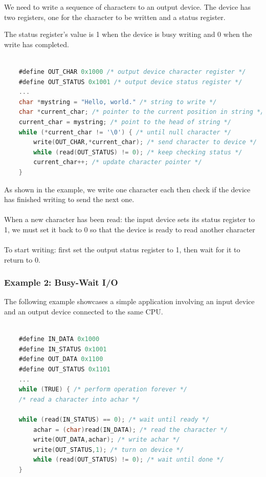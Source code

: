 We need to write a sequence of characters to an output device. The device has two registers, one for the
character to be written and a status register.

The status register's value is 1 when the device is busy writing and 0 when the write has completed.


\begin{lstlisting}[language=C]

    #define OUT_CHAR 0x1000 /* output device character register */
    #define OUT_STATUS 0x1001 /* output device status register */
    ...
    char *mystring = "Hello, world." /* string to write */
    char *current_char; /* pointer to the current position in string */
    current_char = mystring; /* point to the head of string */
    while (*current_char != '\0') { /* until null character */
        write(OUT_CHAR,*current_char); /* send character to device */
        while (read(OUT_STATUS) != 0); /* keep checking status */
        current_char++; /* update character pointer */
    }   
\end{lstlisting}

As shown in the example, we write one character each then check if the device has finished writing to
send the next one.

\paragraph{}
When a new character has been read: the input device sets its status register to 1, we must set it back to 0 so that the device is ready to read another character 

\paragraph{}To start writing: first set the output status register to 1, then wait for it to return to 0.

\subsubsection{Example 2: Busy-Wait I/O}
The following example showcases a simple application involving an input device and an output device
connected to the same CPU.

\begin{lstlisting}[language=C]

    #define IN_DATA 0x1000
    #define IN_STATUS 0x1001
    #define OUT_DATA 0x1100
    #define OUT_STATUS 0x1101
    ...
    while (TRUE) { /* perform operation forever */
    /* read a character into achar */
    
    while (read(IN_STATUS) == 0); /* wait until ready */
        achar = (char)read(IN_DATA); /* read the character */
        write(OUT_DATA,achar); /* write achar */
        write(OUT_STATUS,1); /* turn on device */
        while (read(OUT_STATUS) != 0); /* wait until done */
    }   
\end{lstlisting}

